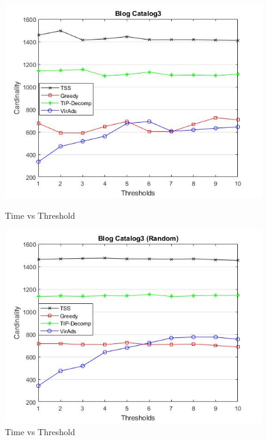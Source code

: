\begin{figure}[h!]
\begin{minipage}[t]{0.50\textwidth}
\includegraphics[width=\linewidth,keepaspectratio=true]{images/bc3time.jpg}
\caption{Time vs Threshold}
\label{fase1}
\end{minipage}
\begin{minipage}[t]{0.50\textwidth}
\includegraphics[width=\linewidth,keepaspectratio=true]{images/bc3timerandom.jpg}
\caption{Time vs Threshold}
\end{minipage}
\end{figure}
